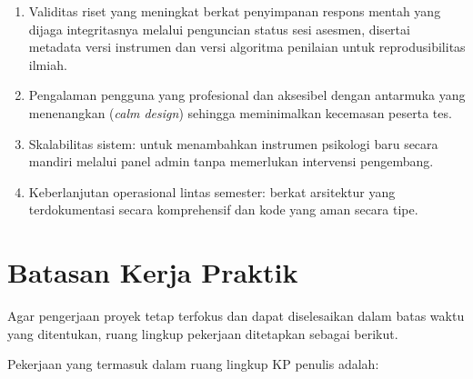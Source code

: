 \begin{enumerate}[leftmargin=2cm]
  \item Validitas riset yang meningkat berkat penyimpanan respons mentah yang dijaga integritasnya melalui penguncian status sesi asesmen, disertai metadata versi instrumen dan versi algoritma penilaian untuk reprodusibilitas ilmiah.
  \item Pengalaman pengguna yang profesional dan aksesibel dengan antarmuka yang menenangkan (\textit{calm design}) sehingga meminimalkan kecemasan peserta tes.
  \item Skalabilitas sistem: untuk menambahkan instrumen psikologi baru secara mandiri melalui panel admin tanpa memerlukan intervensi pengembang.
  \item Keberlanjutan operasional lintas semester: berkat arsitektur yang terdokumentasi secara komprehensif dan kode yang aman secara tipe.
\end{enumerate}

\section{Batasan Kerja Praktik}
\label{sec:batasan-kp}

Agar pengerjaan proyek tetap terfokus dan dapat diselesaikan dalam batas waktu yang ditentukan, ruang lingkup pekerjaan ditetapkan sebagai berikut.

Pekerjaan yang termasuk dalam ruang lingkup KP penulis adalah:

